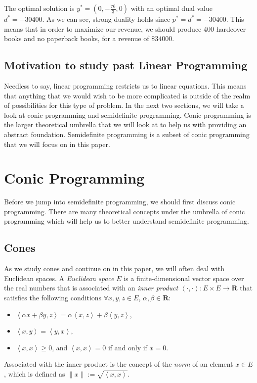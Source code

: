 	The optimal solution is $y^* = (0, - \frac{76}{3}, 0)$ with an optimal dual value $d^* = -30400$. As we can see, strong duality holds since $p^* = d^* = -30400$. This means that in order to maximize our revenue, we should produce 400 hardcover books and no paperback books, for a revenue of $\$34000$. 
	
	
	
	
	\subsection{Motivation to study past Linear Programming}
	
	Needless to say, linear programming restricts us to linear equations. This means that anything that we would wish to be more complicated is outside of the realm of possibilities for this type of problem. In the next two sections, we will take a look at conic programming and semidefinite programming. Conic programming is the larger theoretical umbrella that we will look at to help us with providing an abstract foundation. Semidefinite programming is a subset of conic programming that we will focus on in this paper. 
	
	\section{Conic Programming}
	
	Before we jump into semidefinite programming, we should first discuss conic programming. There are many theoretical concepts under the umbrella of conic programming which will help us to better understand semidefinite programming. 
	
	\subsection{Cones}
	
	As we study cones and continue on in this paper, we will often deal with Euclidean spaces. A \emph{Euclidean space} $E$ is a finite-dimensional vector space over the real numbers that is associated with an \emph{inner product} $\left< \cdot , \cdot \right>: E \times E \rightarrow \mathbf{R}$ that satisfies the following conditions $\forall x, y, z \in E$, $\alpha, \beta \in \mathbf{R}$:
	
	\begin{itemize}
		\item $\left< \alpha x + \beta y, z \right> = \alpha \left<x, z \right> + \beta \left<y,z\right>$,
		
		\item $\left<x, y\right> = \left<y,x\right>$,
		
		\item $\left< x, x\right> \geq 0$, and $\left<x, x\right> = 0$ if and only if $x = 0$. 
	\end{itemize}
	Associated with the inner product is the concept of the \emph{norm} of an element $x \in E$, which is defined as $\|x\| := \sqrt{\left<x,x\right>}$.

